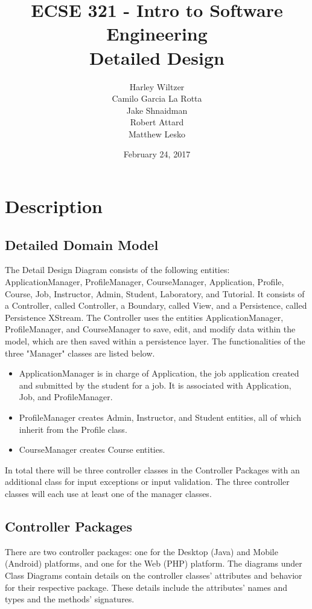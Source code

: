 \documentclass[12pt]{article}
\title{ECSE 321 - Intro to Software Engineering\\Detailed Design}
\author{Harley Wiltzer\\Camilo Garcia La Rotta\\Jake Shnaidman\\Robert Attard\\Matthew Lesko}
\date{February 24, 2017}
\begin{document}
\maketitle
\newpage
{} %
\tableofcontents
\section{Description}
\subsection{Detailed Domain Model}
The Detail Design Diagram consists of the following entities: ApplicationManager, ProfileManager, CourseManager, Application, Profile, Course, Job, Instructor, Admin, Student, Laboratory, and Tutorial. It consists of a Controller, called Controller, a Boundary, called View, and a Persistence, called Persistence XStream. The Controller uses the entities ApplicationManager, ProfileManager, and CourseManager to save, edit, and modify data within the model, which are then saved within a persistence layer. The functionalities of the three "Manager" classes are listed below.
\begin{itemize}
	\item ApplicationManager is in charge of Application, the job application created and submitted by the student for a job. It is associated with Application, Job, and ProfileManager.
	\item ProfileManager creates Admin, Instructor, and Student entities, all of which inherit from the Profile class.
	\item CourseManager creates Course entities.
\end{itemize}
In total there will be three controller classes in the Controller Packages with an additional class for input exceptions or input validation. The three controller classes will each use at least one of the manager classes.
\subsection{Controller Packages}
There are two controller packages: one for the Desktop (Java) and Mobile (Android) platforms, and one for the Web (PHP) platform. The diagrams under Class Diagrams contain details on the controller classes' attributes and behavior for their respective package. These details include the attributes' names and types and the methods' signatures.
\end{document}
